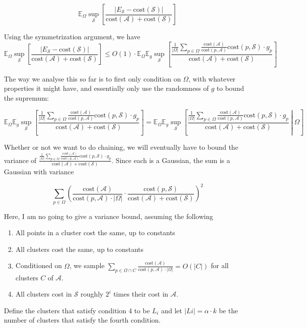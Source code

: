\documentclass{article}
\newcommand{\cost}{\text{cost}}
\newcommand{\calS}{\mathcal{S}}
\newcommand{\greedy}{\mathcal{A}}
\newcommand{\coreset}{\Omega}
\begin{document}
$$\mathbb{E}_{\coreset}\sup_{\calS}\left[\frac{|E_{\calS} - \cost(\calS)|}{\cost(\greedy)+\cost(\calS)}\right]$$

Using the symmetrization argument, we have 
$$\mathbb{E}_{\coreset}\sup_{\calS}\left[\frac{|E_{\calS} - \cost(\calS)|}{\cost(\greedy)+\cost(\calS)}\right]\leq O(1)\cdot \mathbb{E}_{\coreset}\mathbb{E}_{g}\sup_{\calS}\left[\frac{\frac{1}{|\Omega|}\sum_{p\in \Omega} \frac{\cost(\greedy)}{\cost(p,\greedy)}\cost(p,\calS) \cdot g_p}{\cost(\greedy)+\cost(\calS)}\right]$$


The way we analyse this so far is to first only condition on $\coreset$, with whatever properties it might have, and essentially only use the randomness of $g$ to bound the supremum:

$$ \mathbb{E}_{\coreset}\mathbb{E}_{g}\sup_{\calS}\left[\frac{\frac{1}{|\Omega|}\sum_{p\in \Omega} \frac{\cost(\greedy)}{\cost(p,\greedy)}\cost(p,\calS) \cdot g_p}{\cost(\greedy)+\cost(\calS)}\right] = \mathbb{E}_{\coreset}\mathbb{E}_{g}\sup_{\calS}\left[\left.\frac{\frac{1}{|\Omega|}\sum_{p\in \Omega} \frac{\cost(\greedy)}{\cost(p,\greedy)}\cost(p,\calS) \cdot g_p}{\cost(\greedy)+\cost(\calS)}~\right\vert~\coreset\right]$$

Whether or not we want to do chaining, we will eventually have to bound the variance of  $\frac{\frac{1}{|\Omega|}\sum_{p\in \Omega} \frac{\cost(\greedy)}{\cost(p,\greedy)}\cost(p,\calS) \cdot g_p}{\cost(\greedy)+\cost(\calS)}$. Since each is a Gaussian, the sum is a Gaussian with variance

$$ \sum_{p\in \Omega} \left(\frac{\cost(\greedy)}{\cost(p,\greedy)\cdot |\coreset|}\cdot\frac{\cost(p,\calS)}{\cost(\greedy)+\cost(\calS)}\right)^2$$

Here, I am no going to give a variance bound, assuming the following
\begin{enumerate}
\item All points in a cluster cost the same, up to constants
\item All clusters cost the same, up to constants
\item Conditioned on $\coreset$, we sample $\sum_{p\in \coreset\cap C} \frac{\cost(\greedy)}{\cost(p,\greedy)\cdot |\coreset|} = O(|C|)$ for all clusters $C$ of $\greedy$.
\item All clusters cost in $\calS$ roughly $2^i$ times their cost in $\greedy$.
\end{enumerate}

Define the clusters that satisfy condition 4 to be $L_i$ and let $|Li|=\alpha\cdot k$ be the number of clusters that satisfy the fourth condition. 
\end{document}
